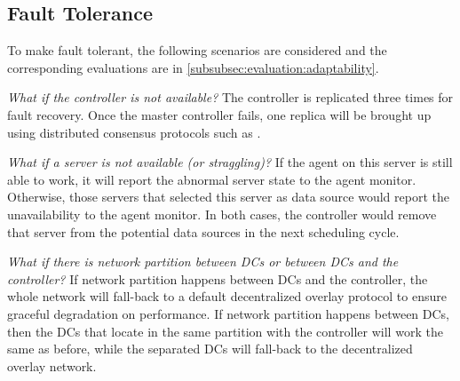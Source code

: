

\subsection{Fault Tolerance}
\label{subsec:system:fault}
To make \name fault tolerant, the following scenarios are considered and the corresponding evaluations are in \Section\ref{subsubsec:evaluation:adaptability}.

\begin{packedenumerate}
\item \emph{What if the controller is not available?} The controller is replicated three times for fault recovery. Once the master controller fails, one replica will be brought up using distributed consensus protocols such as \cite{lamport1998part}.
\item \emph{What if a server is not available (or straggling)?} If the agent on this server is still able to work, it will report the abnormal server state to the agent monitor. Otherwise, those servers that selected this server as data source would report the unavailability to the agent monitor. In both cases, the controller would remove that server from the potential data sources in the next scheduling cycle.
\item \emph{What if there is network partition between DCs or between DCs and the controller?} If network partition happens between DCs and the controller, the whole network will fall-back to a default decentralized overlay protocol to ensure graceful degradation on performance. If network partition happens between DCs, then the DCs that locate in the same partition with the controller will work the same as before, while the separated DCs will fall-back to the decentralized overlay network.
\end{packedenumerate}
%
%
%
%
%



